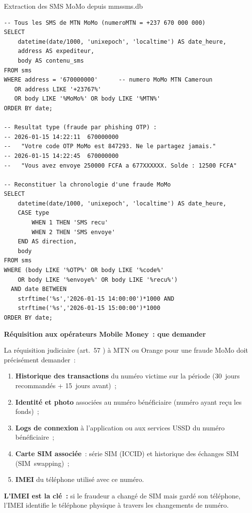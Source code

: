 \begin{boxoutils}{Extraction des SMS MoMo depuis mmssms.db}
\begin{lstlisting}[language=bash_forensique]
-- Tous les SMS de MTN MoMo (numeroMTN = +237 670 000 000)
SELECT
    datetime(date/1000, 'unixepoch', 'localtime') AS date_heure,
    address AS expediteur,
    body AS contenu_sms
FROM sms
WHERE address = '670000000'      -- numero MoMo MTN Cameroun
   OR address LIKE '+23767%'
   OR body LIKE '%MoMo%' OR body LIKE '%MTN%'
ORDER BY date;

-- Resultat type (fraude par phishing OTP) :
-- 2026-01-15 14:22:11  670000000
--   "Votre code OTP MoMo est 847293. Ne le partagez jamais."
-- 2026-01-15 14:22:45  670000000
--   "Vous avez envoye 250000 FCFA a 677XXXXXX. Solde : 12500 FCFA"

-- Reconstituer la chronologie d'une fraude MoMo
SELECT
    datetime(date/1000, 'unixepoch', 'localtime') AS date_heure,
    CASE type
        WHEN 1 THEN 'SMS recu'
        WHEN 2 THEN 'SMS envoye'
    END AS direction,
    body
FROM sms
WHERE (body LIKE '%OTP%' OR body LIKE '%code%'
    OR body LIKE '%envoye%' OR body LIKE '%recu%')
  AND date BETWEEN
    strftime('%s','2026-01-15 14:00:00')*1000 AND
    strftime('%s','2026-01-15 15:00:00')*1000
ORDER BY date;
\end{lstlisting}
\end{boxoutils}

\begin{boxPNC}
\textbf{Réquisition aux opérateurs Mobile Money~: que demander}

La réquisition judiciaire (art.~57 ) à MTN ou Orange
pour une fraude MoMo doit précisément demander~:
\begin{enumerate}
    \item \textbf{Historique des transactions} du numéro victime
          sur la période (30~jours recommandés + 15~jours avant)~;
    \item \textbf{Identité et photo} associées au numéro bénéficiaire
          (numéro ayant reçu les fonds)~;
    \item \textbf{Logs de connexion} à l'application ou aux services
          USSD du numéro bénéficiaire~;
    \item \textbf{Carte SIM associée}~: série SIM (ICCID) et historique
          des échanges SIM (SIM~swapping)~;
    \item \textbf{IMEI} du téléphone utilisé avec ce numéro.
\end{enumerate}
\textbf{L'IMEI est la clé~:} si le fraudeur a changé de SIM mais
gardé son téléphone, l'IMEI identifie le téléphone physique à travers
les changements de numéro.
\end{boxPNC}

